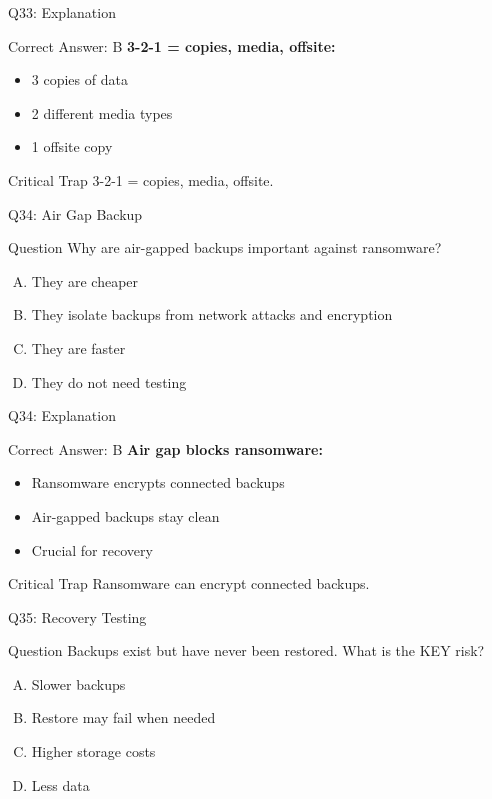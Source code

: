 \documentclass{beamer}
\begin{document}
	\begin{frame}{Q33: Explanation}
		\begin{block}{Correct Answer: B}
			\textbf{3-2-1 = copies, media, offsite:}
			\begin{itemize}
				\item 3 copies of data
				\item 2 different media types
				\item 1 offsite copy
			\end{itemize}
		\end{block}
		\begin{alertblock}{Critical Trap}
			3-2-1 = copies, media, offsite.
		\end{alertblock}
	\end{frame}
	
	\begin{frame}{Q34: Air Gap Backup}
		\begin{block}{Question}
			Why are air-gapped backups important against ransomware?
		\end{block}
		\begin{enumerate}[(A)]
			\item They are cheaper
			\item They isolate backups from network attacks and encryption
			\item They are faster
			\item They do not need testing
		\end{enumerate}
	\end{frame}
	
	\begin{frame}{Q34: Explanation}
		\begin{block}{Correct Answer: B}
			\textbf{Air gap blocks ransomware:}
			\begin{itemize}
				\item Ransomware encrypts connected backups
				\item Air-gapped backups stay clean
				\item Crucial for recovery
			\end{itemize}
		\end{block}
		\begin{alertblock}{Critical Trap}
			Ransomware can encrypt connected backups.
		\end{alertblock}
	\end{frame}
	
	\begin{frame}{Q35: Recovery Testing}
		\begin{block}{Question}
			Backups exist but have never been restored. What is the KEY risk?
		\end{block}
		\begin{enumerate}[(A)]
			\item Slower backups
			\item Restore may fail when needed
			\item Higher storage costs
			\item Less data
		\end{enumerate}
	\end{frame}
	
\end{document}
